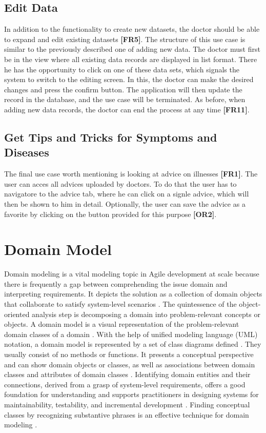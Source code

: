 \subsection{Edit Data}
In addition to the functionality to create new datasets, the doctor should be able to expand and edit existing datasets \textbf{[FR5]}. The structure of this use case is similar to the previously described one of adding new data. The doctor must first be in the view where all existing data records are displayed in list format. There he has the opportunity to click on one of these data sets, which signals the system to switch to the editing screen. In this, the doctor can make the desired changes and press the confirm button. The application will then update the record in the database, and the use case will be terminated. As before, when adding new data records, the doctor can end the process at any time \textbf{[FR11]}.

\subsection{Get Tips and Tricks for Symptoms and Diseases}
The final use case worth mentioning is looking at advice on illnesses \textbf{[FR1]}. The user can acces all advices uploaded by doctors. To do that the user has to navigatore to the advice tab, where he can click on a signle advice, which will then be shown to him in detail. Optionally, the user can save the advice as a favorite by clicking on the button provided for this purpose \textbf{[OR2]}. 
\pagebreak
\section{Domain Model}
Domain modeling is a vital modeling topic in Agile development at scale because there is frequently a gap between comprehending the issue domain and interpreting requirements. It depicts the solution as a collection of domain objects that collaborate to satisfy system-level scenarios \cite{.safe}. The quintessence of the object-oriented analysis step is decomposing a domain into problem-relevant concepts or objects. A domain model is a visual representation of the problem-relevant domain classes of a domain \cite{.safe}. With the help of unified modeling language (UML) notation, a domain model is represented by a set of class diagrams defined \cite{.domainmodel}. They usually consist of no methods or functions. It presents a conceptual perspective and can show domain objects or classes, as well as associations between domain classes and attributes of domain classes \cite{.safe} \cite{.domainmodel}. Identifying domain entities and their connections, derived from a grasp of system-level requirements, offers a good foundation for understanding and supports practitioners in designing systems for maintainability, testability, and incremental development \cite{.safe}. Finding conceptual classes by recognizing substantive phrases is an effective technique for domain modeling \cite[p. 76]{.domainmodel}.

